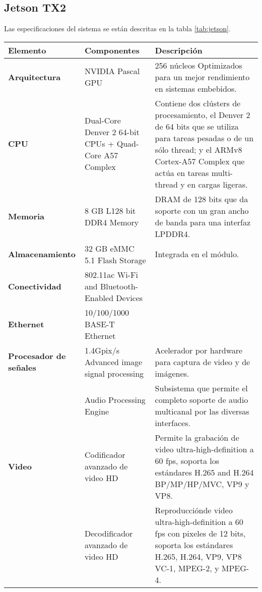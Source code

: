  \subsection{Jetson TX2}
 
    Las especificaciones del sistema se están descritas en la tabla \ref{tab:jetson}.

    \begin{table}[h!]
      \begin{center}
            \small
        \begin{tabular}{|m{3cm}|m{5.5cm}|m{6.5cm}|}
         \hline
        \cellcolor{lightgray}\textbf{Elemento} & \cellcolor{lightgray} \textbf{Componentes} & \cellcolor{lightgray} \textbf{Descripción}\\ 
         \hline
         \textbf{Arquitectura} & NVIDIA Pascal GPU & 256 núcleos Optimizados para un mejor rendimiento en sistemas embebidos.\\
         \hline
         \textbf{CPU} & Dual-Core Denver 2 64-bit CPUs + Quad-Core A57 Complex & Contiene dos clústers de procesamiento, el Denver 2 de 64 bits que se utiliza para tareas pesadas o de un sólo thread; y el ARMv8 Cortex-A57 Complex que actúa en tareas multi-thread y en cargas ligeras.\\
         \hline
         \textbf{Memoria} & 8 GB L128 bit DDR4 Memory & DRAM de 128 bits que da soporte con un gran ancho de banda para una interfaz LPDDR4.  \\
          \hline
    	\textbf{Almacenamiento} & 32 GB eMMC 5.1 Flash Storage & Integrada en el módulo.\\
         \hline
    	\textbf{Conectividad} & 802.11ac Wi-Fi and Bluetooth-Enabled Devices & \\
         \hline
   	 \textbf{Ethernet} &10/100/1000 BASE-T Ethernet & \\
	  \hline
   	 \textbf{Procesador de señales} &1.4Gpix/s Advanced image signal processing & Acelerador por hardware para captura de video y de imágenes.\\
	 &Audio Processing Engine & Subsistema que permite el completo soporte de audio multicanal por las diversas interfaces.\\
	 \hline
   	 \textbf{Video} & Codificador avanzado de video HD & Permite la grabación de video ultra-high-definition a 60 fps, soporta los estándares H.265 and H.264 BP/MP/HP/MVC, VP9 y VP8. \\
	  & Decodificador avanzado de video HD & Reproducciónde video ultra-high-definition a 60 fps con pixeles de 12 bits, soporta los estándares H.265, H.264, VP9, VP8 VC-1, MPEG-2, y MPEG-4. \\

\end{tabular}
\end{center}
\end{table}
